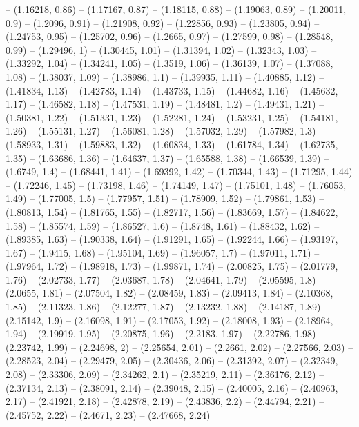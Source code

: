 -- (1.16218, 0.86)
-- (1.17167, 0.87)
-- (1.18115, 0.88)
-- (1.19063, 0.89)
-- (1.20011, 0.9)
-- (1.2096, 0.91)
-- (1.21908, 0.92)
-- (1.22856, 0.93)
-- (1.23805, 0.94)
-- (1.24753, 0.95)
-- (1.25702, 0.96)
-- (1.2665, 0.97)
-- (1.27599, 0.98)
-- (1.28548, 0.99)
-- (1.29496, 1)
-- (1.30445, 1.01)
-- (1.31394, 1.02)
-- (1.32343, 1.03)
-- (1.33292, 1.04)
-- (1.34241, 1.05)
-- (1.3519, 1.06)
-- (1.36139, 1.07)
-- (1.37088, 1.08)
-- (1.38037, 1.09)
-- (1.38986, 1.1)
-- (1.39935, 1.11)
-- (1.40885, 1.12)
-- (1.41834, 1.13)
-- (1.42783, 1.14)
-- (1.43733, 1.15)
-- (1.44682, 1.16)
-- (1.45632, 1.17)
-- (1.46582, 1.18)
-- (1.47531, 1.19)
-- (1.48481, 1.2)
-- (1.49431, 1.21)
-- (1.50381, 1.22)
-- (1.51331, 1.23)
-- (1.52281, 1.24)
-- (1.53231, 1.25)
-- (1.54181, 1.26)
-- (1.55131, 1.27)
-- (1.56081, 1.28)
-- (1.57032, 1.29)
-- (1.57982, 1.3)
-- (1.58933, 1.31)
-- (1.59883, 1.32)
-- (1.60834, 1.33)
-- (1.61784, 1.34)
-- (1.62735, 1.35)
-- (1.63686, 1.36)
-- (1.64637, 1.37)
-- (1.65588, 1.38)
-- (1.66539, 1.39)
-- (1.6749, 1.4)
-- (1.68441, 1.41)
-- (1.69392, 1.42)
-- (1.70344, 1.43)
-- (1.71295, 1.44)
-- (1.72246, 1.45)
-- (1.73198, 1.46)
-- (1.74149, 1.47)
-- (1.75101, 1.48)
-- (1.76053, 1.49)
-- (1.77005, 1.5)
-- (1.77957, 1.51)
-- (1.78909, 1.52)
-- (1.79861, 1.53)
-- (1.80813, 1.54)
-- (1.81765, 1.55)
-- (1.82717, 1.56)
-- (1.83669, 1.57)
-- (1.84622, 1.58)
-- (1.85574, 1.59)
-- (1.86527, 1.6)
-- (1.8748, 1.61)
-- (1.88432, 1.62)
-- (1.89385, 1.63)
-- (1.90338, 1.64)
-- (1.91291, 1.65)
-- (1.92244, 1.66)
-- (1.93197, 1.67)
-- (1.9415, 1.68)
-- (1.95104, 1.69)
-- (1.96057, 1.7)
-- (1.97011, 1.71)
-- (1.97964, 1.72)
-- (1.98918, 1.73)
-- (1.99871, 1.74)
-- (2.00825, 1.75)
-- (2.01779, 1.76)
-- (2.02733, 1.77)
-- (2.03687, 1.78)
-- (2.04641, 1.79)
-- (2.05595, 1.8)
-- (2.0655, 1.81)
-- (2.07504, 1.82)
-- (2.08459, 1.83)
-- (2.09413, 1.84)
-- (2.10368, 1.85)
-- (2.11323, 1.86)
-- (2.12277, 1.87)
-- (2.13232, 1.88)
-- (2.14187, 1.89)
-- (2.15142, 1.9)
-- (2.16098, 1.91)
-- (2.17053, 1.92)
-- (2.18008, 1.93)
-- (2.18964, 1.94)
-- (2.19919, 1.95)
-- (2.20875, 1.96)
-- (2.2183, 1.97)
-- (2.22786, 1.98)
-- (2.23742, 1.99)
-- (2.24698, 2)
-- (2.25654, 2.01)
-- (2.2661, 2.02)
-- (2.27566, 2.03)
-- (2.28523, 2.04)
-- (2.29479, 2.05)
-- (2.30436, 2.06)
-- (2.31392, 2.07)
-- (2.32349, 2.08)
-- (2.33306, 2.09)
-- (2.34262, 2.1)
-- (2.35219, 2.11)
-- (2.36176, 2.12)
-- (2.37134, 2.13)
-- (2.38091, 2.14)
-- (2.39048, 2.15)
-- (2.40005, 2.16)
-- (2.40963, 2.17)
-- (2.41921, 2.18)
-- (2.42878, 2.19)
-- (2.43836, 2.2)
-- (2.44794, 2.21)
-- (2.45752, 2.22)
-- (2.4671, 2.23)
-- (2.47668, 2.24)
